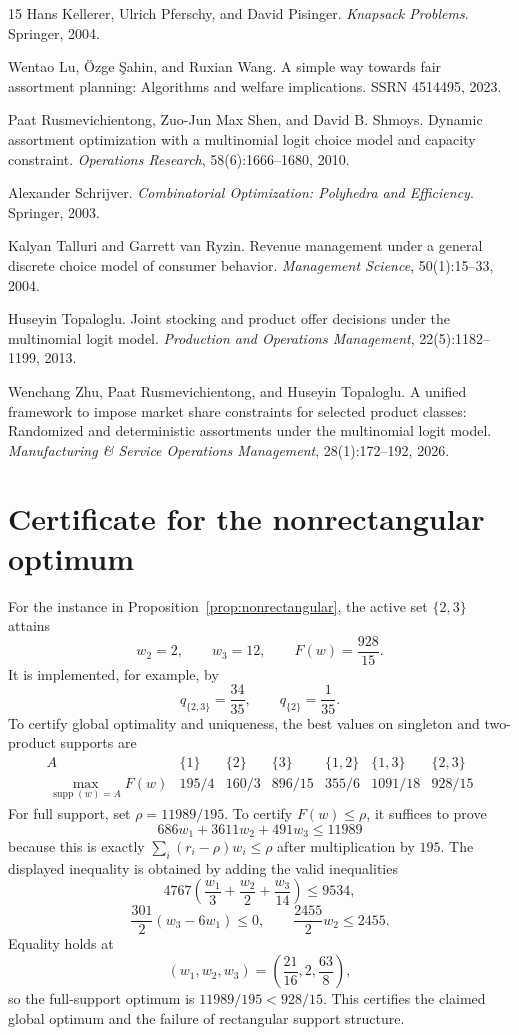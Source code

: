 \documentclass[11pt]{article}
\newcommand{\supp}{\operatorname{supp}}
\begin{document}
\begin{thebibliography}{15}
Hans Kellerer, Ulrich Pferschy, and David Pisinger.
\emph{Knapsack Problems}.
Springer, 2004.

Wentao Lu, \"{O}zge \c{S}ahin, and Ruxian Wang.
A simple way towards fair assortment planning: Algorithms and welfare implications.
SSRN 4514495, 2023.

Paat Rusmevichientong, Zuo-Jun Max Shen, and David B. Shmoys.
Dynamic assortment optimization with a multinomial logit choice model and capacity constraint.
\emph{Operations Research}, 58(6):1666--1680, 2010.

Alexander Schrijver.
\emph{Combinatorial Optimization: Polyhedra and Efficiency}.
Springer, 2003.

Kalyan Talluri and Garrett van Ryzin.
Revenue management under a general discrete choice model of consumer behavior.
\emph{Management Science}, 50(1):15--33, 2004.

Huseyin Topaloglu.
Joint stocking and product offer decisions under the multinomial logit model.
\emph{Production and Operations Management}, 22(5):1182--1199, 2013.

Wenchang Zhu, Paat Rusmevichientong, and Huseyin Topaloglu.
A unified framework to impose market share constraints for selected product classes: Randomized and deterministic assortments under the multinomial logit model.
\emph{Manufacturing \& Service Operations Management}, 28(1):172--192, 2026.
\end{thebibliography}

\clearpage
\appendix
\section{Certificate for the nonrectangular optimum}\label{app:counterexample}
For the instance in Proposition~\ref{prop:nonrectangular}, the active set $\{2,3\}$ attains
\[
 w_2=2,\qquad w_3=12,\qquad F(w)=\frac{928}{15}.
\]
It is implemented, for example, by
\[
 q_{\{2,3\}}=\frac{34}{35},\qquad q_{\{2\}}=\frac1{35}.
\]
To certify global optimality and uniqueness, the best values on singleton and two-product supports are
\[
\begin{array}{c|cccccc}
 A&\{1\}&\{2\}&\{3\}&\{1,2\}&\{1,3\}&\{2,3\}\\\hline
 \max_{\supp(w)=A}F(w)&195/4&160/3&896/15&355/6&1091/18&928/15
\end{array}
\]
For full support, set $\rho=11989/195$. To certify $F(w)\le\rho$, it suffices to prove
\[
 686w_1+3611w_2+491w_3\le11989
\]
because this is exactly $\sum_i(r_i-\rho)w_i\le\rho$ after multiplication by $195$. The displayed inequality is obtained by adding the valid inequalities
\[
 4767\left(\frac{w_1}{3}+\frac{w_2}{2}+\frac{w_3}{14}\right)\le9534,
\]
\[
 \frac{301}{2}(w_3-6w_1)\le0,\qquad \frac{2455}{2}w_2\le2455.
\]
Equality holds at
\[
 (w_1,w_2,w_3)=\left(\frac{21}{16},2,\frac{63}{8}\right),
\]
so the full-support optimum is $11989/195<928/15$. This certifies the claimed global optimum and the failure of rectangular support structure.
\end{document}
